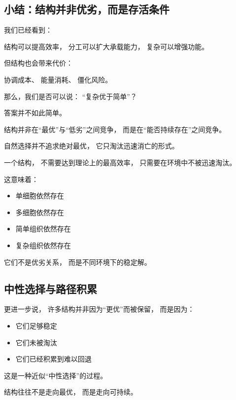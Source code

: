 \documentclass[../main.tex]{subfiles}
\begin{document}
\subsection*{小结：结构并非优劣，而是存活条件}


我们已经看到：

结构可以提高效率，
分工可以扩大承载能力，
复杂可以增强功能。

但结构也会带来代价：

协调成本、
能量消耗、
僵化风险。

那么，我们是否可以说：
“复杂优于简单”？

答案并不如此简单。

\begin{readingnote}
	结构并非在“最优”与“低劣”之间竞争，
	而是在“能否持续存在”之间竞争。
\end{readingnote}

自然选择并不追求绝对最优，
它只淘汰迅速消亡的形式。

一个结构，
不需要达到理论上的最高效率，
只需要在环境中不被迅速淘汰。

这意味着：

\begin{itemize}
	\item 单细胞依然存在
	\item 多细胞依然存在
	\item 简单组织依然存在
	\item 复杂组织依然存在
\end{itemize}

它们不是优劣关系，
而是不同环境下的稳定解。

\subsection*{中性选择与路径积累}

更进一步说，
许多结构并非因为“更优”而被保留，
而是因为：

\begin{itemize}
	\item 它们足够稳定
	\item 它们未被淘汰
	\item 它们已经积累到难以回退
\end{itemize}

这是一种近似“中性选择”的过程。

\begin{readingnote}
	结构往往不是走向最优，
	而是走向可持续。
\end{readingnote}
\end{document}
